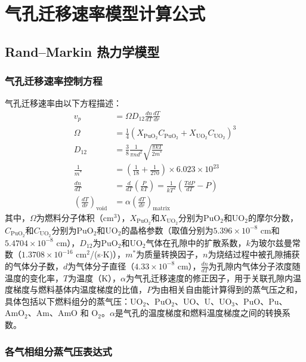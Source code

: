 \chapter{气孔迁移速率模型计算公式}

\section{Rand--Markin 热力学模型}

\subsection{气孔迁移速率控制方程}

气孔迁移速率由以下方程描述：
\begin{equation}
\begin{aligned}
	v_p &= \Omega D_{12} \frac{dn}{dT} \frac{dT}{dr} \\
	\Omega &= \frac{1}{4} (X_{\text{PuO}_2} C_{\text{PuO}_2} + X_{\text{UO}_2} C_{\text{UO}_2})^3 \\
	D_{12} &= \frac{3}{8} \frac{1}{\pi nd^2} \sqrt{\frac{\pi kT}{2m^*}} \\
	\frac{1}{m^*} &= \left( \frac{1}{18} + \frac{1}{270} \right) \times 6.023 \times 10^{23} \\
	\frac{dn}{dT} &= \frac{d}{dT} (\frac{P}{kT}) = \frac{1}{kT^2} \left( \frac{TdP}{dT} - P \right) \\
	\left( \frac{dT}{dr} \right)_{\text{void}} &= \alpha \left( \frac{dT}{dr} \right)_{\text{matrix}}
\end{aligned}
\label{eq:app_b_rand_markin_migration_control}
\end{equation}
其中，$\Omega$为燃料分子体积（cm$^3$），$X_{\text{PuO}_2}$和$X_{\text{UO}_2}$分别为PuO$_2$和UO$_2$的摩尔分数，$C_{\text{PuO}_2}$和$C_{\text{UO}_2}$分别为PuO$_2$和UO$_2$的晶格参数（取值分别为$5.396 \times 10^{-8}$ cm和$5.4704 \times 10^{-8}$ cm），$D_{12}$为PuO$_2$和UO$_2$气体在孔隙中的扩散系数，$k$为玻尔兹曼常数（$1.3708 \times 10^{-16}$ cm$^2$/(s$\cdot$K)），$m^*$为质量转换因子，$n$为烧结过程中被孔隙捕获的气体分子数，$d$为气体分子直径（$4.33 \times 10^{-8}$ cm），$\frac{dn}{dT}$为孔隙内气体分子浓度随温度的变化率，$T$为温度（K），$\alpha$为气孔迁移速度的修正因子，用于关联孔隙内温度梯度与燃料基体内温度梯度的比值，$P$为由相关自由能计算得到的蒸气压之和，具体包括以下燃料组分的蒸气压：UO$_2$、PuO$_2$、UO、U、UO$_3$、PuO、Pu、AmO$_2$、Am、AmO 和 O$_2$。$\alpha$是气孔的温度梯度和燃料温度梯度之间的转换系数。

\subsection{各气相组分蒸气压表达式}

